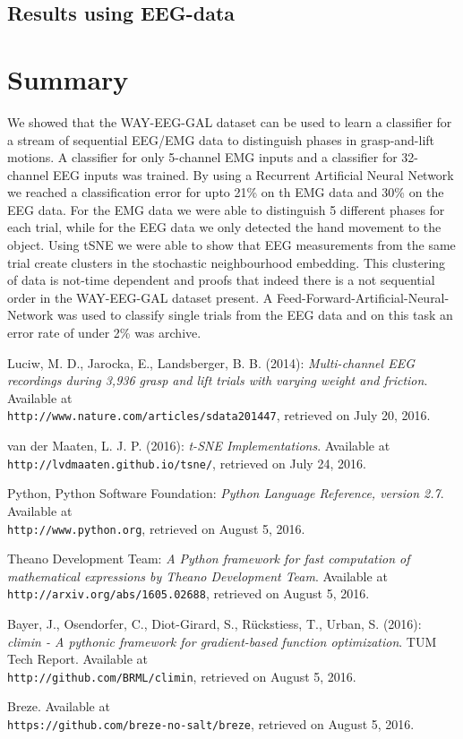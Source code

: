 \documentclass{article} %
\begin{document}
\subsection{Results using EEG-data}

\section{Summary}
We showed that the WAY-EEG-GAL dataset can be used to learn a classifier for a stream of sequential EEG/EMG data to distinguish phases in grasp-and-lift motions.
A classifier for only 5-channel EMG inputs and a classifier for 32-channel EEG inputs was trained.
By using a Recurrent Artificial Neural Network we reached a classification error for upto 21\% on th EMG data and 30\% on the EEG data.
For the EMG data we were able to distinguish 5 different phases for each trial, while for the EEG data we only detected the hand movement to the object.
Using tSNE we were able to show that EEG measurements from the same trial create clusters in the stochastic neighbourhood embedding.
This clustering of data is not-time dependent and proofs that indeed there is a not sequential order in the WAY-EEG-GAL dataset present.
A Feed-Forward-Artificial-Neural-Network was used to classify single trials from the EEG data and on this task an error rate of under 2\% was archive.


\begin{thebibliography}{9}
	Luciw, M. D., Jarocka, E., Landsberger, B. B. (2014): 
	\textit{Multi-channel EEG recordings during 3,936 grasp and lift trials with varying weight and friction}. 
	 Available at \\\texttt{http://www.nature.com/articles/sdata201447}, retrieved on July 20, 2016.
	
	van der Maaten, L. J. P. (2016): 
	\textit{t-SNE Implementations}.
	Available at \\\texttt{http://lvdmaaten.github.io/tsne/}, retrieved on July 24, 2016.
	
	Python, Python Software Foundation:
	\textit{Python Language Reference, version 2.7}.
	Available at \\\texttt{http://www.python.org}, retrieved on August 5, 2016.
	
	Theano Development Team:
	\textit{A Python framework for fast computation of mathematical expressions by Theano Development Team}.
	Available at \\\texttt{http://arxiv.org/abs/1605.02688}, retrieved on August 5, 2016.
	
	Bayer, J., Osendorfer, C., Diot-Girard, S., Rückstiess, T., Urban, S. (2016):
	\textit{climin - A pythonic framework for gradient-based function optimization}.
	 TUM Tech Report. Available at \\\texttt{http://github.com/BRML/climin}, retrieved on August 5, 2016.
	 
	 Breze.
	 Available at \\\texttt{https://github.com/breze-no-salt/breze}, retrieved on August 5, 2016.
\end{thebibliography}
\end{document}
